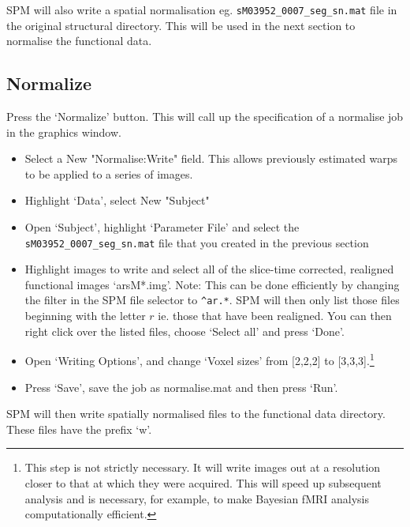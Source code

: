 \documentclass[a4paper,titlepage]{book}
\newcommand{\bi}{\begin{itemize}}
\newcommand{\ei}{\end{itemize}}
\begin{document}
SPM will also write a spatial normalisation eg. 
\verb!sM03952_0007_seg_sn.mat! file in the 
original structural directory. This will be used 
in the next section to normalise the functional data. 


\subsection{Normalize}

Press the `Normalize' button. This will call up the specification of a normalise job in the graphics 
window. 

\bi
\item{Select a New "Normalise:Write" field. This 
allows previously estimated warps to be applied to 
a series of images.}
\item{Highlight `Data', select New "Subject"}
\item{Open `Subject', highlight `Parameter File' and 
select the \verb!sM03952_0007_seg_sn.mat! file that you 
created in the previous section}
\item{Highlight images to write and select all of the 
slice-time corrected, realigned functional images `arsM*.img'. Note: This can be done efficiently by changing the filter in the SPM file selector to \verb!^ar.*!. SPM will then only list those files beginning with the letter $r$ ie. those that have been realigned. You can then right click over the listed files, choose `Select all' and press `Done'.}
\item{Open `Writing Options', and change `Voxel sizes' from [2,2,2] to [3,3,3].\footnote{This step is not 
strictly necessary. It will write images out at 
a resolution closer to that at which they were acquired. 
This will speed up subsequent analysis and is necessary, for example, to make Bayesian fMRI analysis computationally efficient.}}
\item{Press `Save', save the job as normalise.mat and then
press `Run'.}
\ei
SPM will then write spatially normalised files to the 
functional data directory. These files have the prefix `w'.
\end{document}
